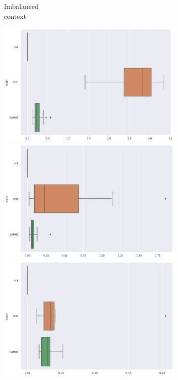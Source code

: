 \documentclass{article}
\theoremstyle{definition}
\begin{document}
\begin{figure}[ht]
\begin{subfigure}[b]{0.15\textwidth}
         \caption{Imbalanced \\ context}
         \label{Boxplots_Corr_Xhat_Imb}
     \end{subfigure}
     \begin{subfigure}[b]{0.15\textwidth}
         \centering
         \includegraphics[width=\textwidth]{imgs/Illu/1000Epochs/Bal/Boxplots_Corr_Xhat.png}
         \quad
         \includegraphics[width=\textwidth]{imgs/Illu/2000Epochs/Bal/Boxplots_Corr_Xhat.png}
         \quad
         \includegraphics[width=\textwidth]{imgs/Illu/3000Epochs/Bal/Boxplots_Corr_Xhat.png}   

\end{subfigure}
\end{figure}
\end{document}
